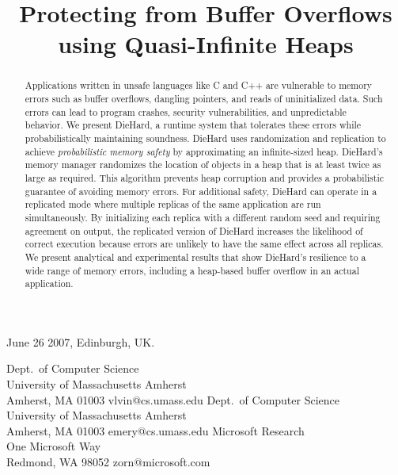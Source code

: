 \documentclass{sig-alternate}
\begin{document}
 {June 26 2007, Edinburgh, UK.} 





\title{Protecting from Buffer Overflows using Quasi-Infinite Heaps}

{Dept.\ of Computer Science \\
University of Massachusetts Amherst \\
Amherst, MA 01003}
{vlvin@cs.umass.edu}
{Dept.\ of Computer Science \\
University of Massachusetts Amherst \\
Amherst, MA 01003}
{emery@cs.umass.edu}
{Microsoft Research \\
One Microsoft Way \\
Redmond, WA 98052}
{zorn@microsoft.com}

\maketitle

\begin{abstract}
Applications written in unsafe languages like C and C++ are vulnerable
to memory errors such as buffer overflows, dangling pointers, and
reads of uninitialized data. Such errors can lead to program crashes,
security vulnerabilities, and unpredictable behavior. We present
DieHard, a runtime system that tolerates these errors while
probabilistically maintaining soundness. DieHard uses randomization
and replication to achieve \emph{probabilistic memory safety} by
approximating an infinite-sized heap.  DieHard's memory manager
randomizes the location of objects in a heap that is at least twice as
large as required.  This algorithm prevents heap corruption
and provides a probabilistic guarantee of avoiding memory
errors. For additional safety, DieHard can operate in a replicated
mode where multiple replicas of the same application are run
simultaneously.  By initializing each replica with a different random
seed and requiring agreement on output, the replicated version of
DieHard increases the likelihood of correct execution because errors
are unlikely to have the same effect across all replicas. We present
analytical and experimental results that show DieHard's resilience to
a wide range of memory errors, including a heap-based buffer overflow
in an actual application.

\end{abstract}
\end{document}
